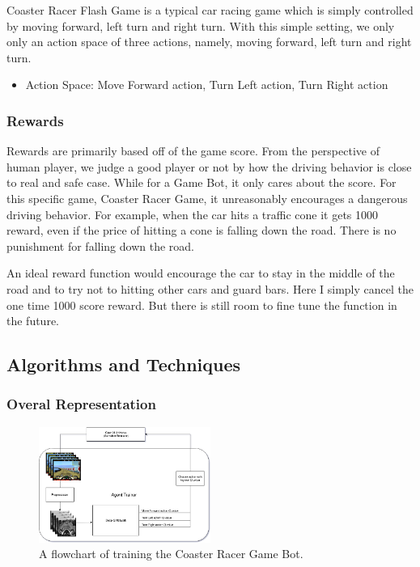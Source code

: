 \documentclass[a4paper]{article}
\begin{document}
Coaster Racer Flash Game is a typical car racing game which is simply controlled by moving forward, left turn and right turn. With this simple setting, we only only an action space of three actions, namely, moving forward, left turn and right turn.

\begin{itemize}
	
	\item Action Space: {Move Forward action, Turn Left action, Turn Right action}

\end{itemize}

\subsubsection{Rewards}

Rewards are primarily based off of the game score. From the perspective of human player, we judge a good player or not by how the driving behavior is close to real and safe case. While for a Game Bot, it only cares about the score. For this specific game, Coaster Racer Game, it unreasonably encourages a dangerous driving behavior. For example, when the car hits a traffic cone it gets 1000 reward, even if the price of hitting a cone is falling down the road. There is no punishment for falling down the road.

An ideal reward function would encourage the car to stay in the middle of the road and to try not to hitting other cars and guard bars. Here I simply cancel the one time 1000 score reward. But there is still room to fine tune the function in the future.

\subsection{Algorithms and Techniques}

\subsubsection{Overal Representation}

\begin{figure}[h]
\centering
\includegraphics[width=0.5\textwidth]{implementation}
\caption{A flowchart of training the Coaster Racer Game Bot.}
\end{figure}
\end{document}
